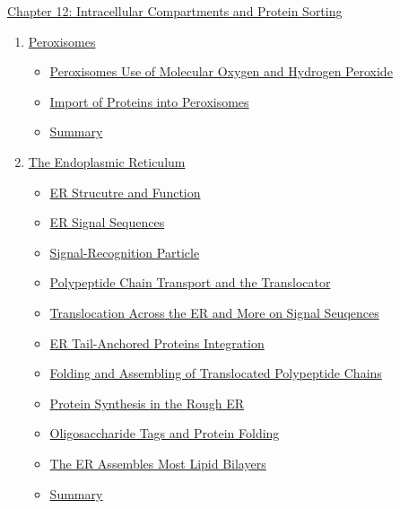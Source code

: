 \documentclass[12pt,letterpaper]{article}
\begin{document}
\begin{chapbox}{\hyperlink{home}{Chapter 12: Intracellular Compartments and Protein Sorting}}
\begin{enumerate}
            \begin{itemize}
                \item \hyperlink{12.3.1}{Translocation into Mitochondria}
                \item \hyperlink{12.3.2}{Mitochondrial Precursor Proteins}
                \item \hyperlink{12.3.3}{Protein Import into the Matrix Space}
                \item \hyperlink{12.3.4}{Bacterial and Mitochondrial Insertion of Poroins into Outer Membrane}
                \item \hyperlink{12.3.r}{Summary}
            \end{itemize}
        \item \hyperlink{12.4}{Peroxisomes}
            \begin{itemize}
                \item \hyperlink{12.4.1}{Peroxisomes Use of Molecular Oxygen and Hydrogen Peroxide}
                \item \hyperlink{12.4.2}{Import of Proteins into Peroxisomes}
                \item \hyperlink{12.4.r}{Summary}
            \end{itemize}
        \item \hyperlink{12.5}{The Endoplasmic Reticulum}
            \begin{itemize}
                \item \hyperlink{12.5.1}{ER Strucutre and Function}
                \item \hyperlink{12.5.2}{ER Signal Sequences}
                \item \hyperlink{12.5.3}{Signal-Recognition Particle}
                \item \hyperlink{12.5.4}{Polypeptide Chain Transport and the Translocator}
                \item \hyperlink{12.5.5}{Translocation Across the ER and More on Signal Seuqences}
                \item \hyperlink{12.5.6}{ER Tail-Anchored Proteins Integration}
                \item \hyperlink{12.5.7}{Folding and Assembling of Translocated Polypeptide Chains}
                \item \hyperlink{12.5.8}{Protein Synthesis in the Rough ER}
                \item \hyperlink{12.5.9}{Oligosaccharide Tags and Protein Folding}
                \item \hyperlink{12.5.10}{The ER Assembles Most Lipid Bilayers}
                \item \hyperlink{12.5.r}{Summary}
            \end{itemize}
    \end{enumerate}
\end{chapbox}
\end{document}
